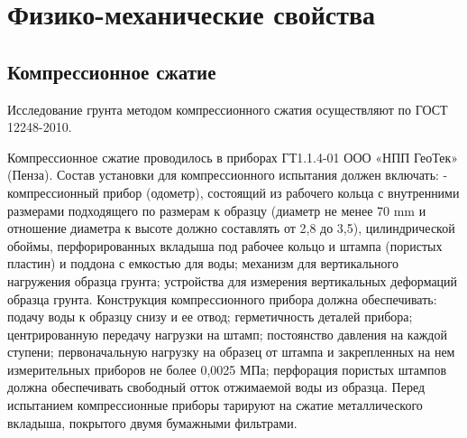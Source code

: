 \section{Физико-механические свойства}\label{sec:ch6/sec2}

\subsection{Компрессионное сжатие}

Исследование грунта методом компрессионного сжатия осуществляют по ГОСТ 12248-2010.


Компрессионное сжатие проводилось в приборах ГТ1.1.4-01 ООО «НПП ГеоТек» (Пенза).
Состав установки для компрессионного испытания должен включать: 
- компрессионный прибор (одометр), состоящий из рабочего кольца с
внутренними размерами подходящего по размерам к образцу (диаметр не менее 70 \si{\milli\meter} 
и отношение диаметра к высоте должно составлять от 2,8 до 3,5), цилиндрической обоймы,
перфорированных вкладыша под рабочее кольцо и штампа (пористых
пластин) и поддона с емкостью для воды; механизм для вертикального нагружения образца грунта; 
устройства для измерения вертикальных деформаций образца грунта.
Конструкция компрессионного прибора должна обеспечивать: подачу воды к образцу снизу и ее отвод; 
герметичность деталей прибора; центрированную передачу нагрузки на штамп; постоянство давления 
на каждой ступени; первоначальную нагрузку на образец от штампа и закрепленных на нем
измерительных приборов не более 0,0025 МПа; перфорация пористых штампов должна 
обеспечивать свободный отток отжимаемой воды из образца.
Перед испытанием компрессионные приборы тарируют на сжатие металлического 
вкладыша, покрытого двумя бумажными фильтрами.

